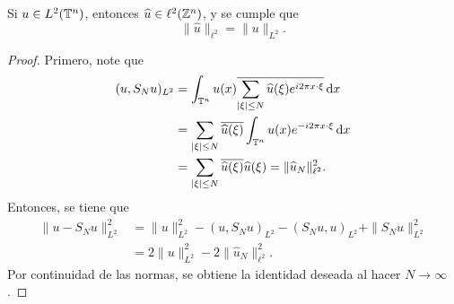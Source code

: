 \begin{theorem}
	Si $u\in L^2(\mathbb{T}^n)$, entonces $\widehat{u}\in\ell^2(\mathbb{Z}^n)$, y se cumple que 
	\begin{equation*}
		\|\widehat{u}\|_{\ell^2} = \|u\|_{L^2}.
	\end{equation*}
\end{theorem}
\begin{proof}
	Primero, note que 
	\begin{align*}
		(u, S_Nu)_{L^2} &= \int_{\mathbb{T}^n} u(x) \overline{\sum_{|\xi|\leq N}\widehat{u}(\xi)e^{i2\pi x\cdot\xi}}\mathop{}\!\mathrm{d} x \\
		& = \sum_{|\xi|\leq N} \overline{\widehat{u}(\xi)} \int_{\mathbb{T}^n} u(x)e^{-i2\pi x\cdot\xi} \mathop{}\!\mathrm{d} x \\
		& = \sum_{|\xi|\leq N} \overline{\widehat{u}(\xi)} \widehat{u}(\xi) = \|\widehat{u}_N\|_{\ell^2}^2.
	\end{align*}
	Entonces, se tiene que 
	\begin{align*}
		\|u-S_Nu\|_{L^2}^2 & = \|u\|_{L^2}^2 - (u, S_Nu)_{L^2} - (S_Nu, u)_{L^2} + \|S_Nu\|_{L^2}^2 \\
		& = 2\|u\|_{L^2}^2 - 2\|\widehat{u}_N\|_{\ell^2}^2.
	\end{align*}
	Por continuidad de las normas, se obtiene la identidad deseada al hacer $N\to\infty$. 
\end{proof}

